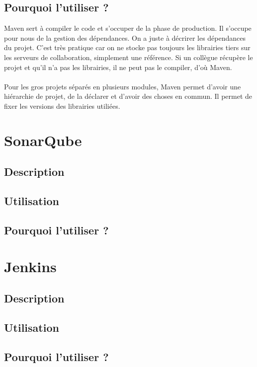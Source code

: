 \documentclass{article}
\begin{document}
\subsection{Pourquoi l'utiliser ?}
Maven sert à compiler le code et s'occuper de la phase de production. Il s'occupe pour nous de la gestion des dépendances. On a juste à décrirer les dépendances du projet. C'est très pratique car on ne stocke pas toujours les librairies tiers sur les serveurs de collaboration, simplement une référence. Si un collègue récupère le projet et qu'il n'a pas les librairies, il ne peut pas le compiler, d'où Maven. \\\\
Pour les gros projets séparés en plusieurs modules, Maven permet d'avoir une hiérarchie de projet, de la déclarer et d'avoir des choses en commun. Il permet de fixer les versions des librairies utiliées.

\section{SonarQube}
\subsection{Description}
\subsection{Utilisation}
\subsection{Pourquoi l'utiliser ?}


\section{Jenkins}
\subsection{Description}
\subsection{Utilisation}
\subsection{Pourquoi l'utiliser ?}
\end{document}
